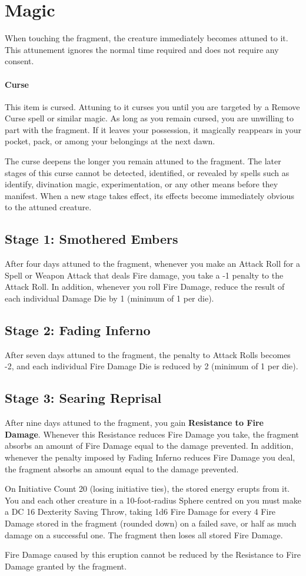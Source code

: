 \section*{Magic}
{\entryfont When touching the fragment, the creature immediately becomes attuned to it. This attunement ignores the normal time required and does not require any consent.

\paragraph*{Curse} This item is cursed. Attuning to it curses you until you are targeted by a Remove Curse spell or similar magic. As long as you remain cursed, you are unwilling to part with the fragment. If it leaves your possession, it magically reappears in your pocket, pack, or among your belongings at the next dawn.

The curse deepens the longer you remain attuned to the fragment. The later stages of this curse cannot be detected, identified, or revealed by spells such as identify, divination magic, experimentation, or any other means before they manifest. When a new stage takes effect, its effects become immediately obvious to the attuned creature.}
\subsection*{Stage 1: Smothered Embers}
{\entryfont After four days attuned to the fragment, whenever you make an Attack Roll for a Spell or Weapon Attack that deals Fire damage, you take a -1 penalty to the Attack Roll. In addition, whenever you roll Fire Damage, reduce the result of each individual Damage Die by 1 (minimum of 1 per die).}
\subsection*{Stage 2: Fading Inferno}
{\entryfont After seven days attuned to the fragment, the penalty to Attack Rolls becomes -2, and each individual Fire Damage Die is reduced by 2 (minimum of 1 per die).}
\subsection*{Stage 3: Searing Reprisal}
{\entryfont After nine days attuned to the fragment, you gain \textbf{Resistance to Fire Damage}. Whenever this Resistance reduces Fire Damage you take, the fragment absorbs an amount of Fire Damage equal to the damage prevented. In addition, whenever the penalty imposed by Fading Inferno reduces Fire Damage you deal, the fragment absorbs an amount equal to the damage prevented.

On Initiative Count 20 (losing initiative ties), the stored energy erupts from it. You and each other creature in a 10-foot-radius Sphere centred on you must make a DC 16 Dexterity Saving Throw, taking 1d6 Fire Damage for every 4 Fire Damage stored in the fragment (rounded down) on a failed save, or half as much damage on a successful one. The fragment then loses all stored Fire Damage.

Fire Damage caused by this eruption cannot be reduced by the Resistance to Fire Damage granted by the fragment.}

